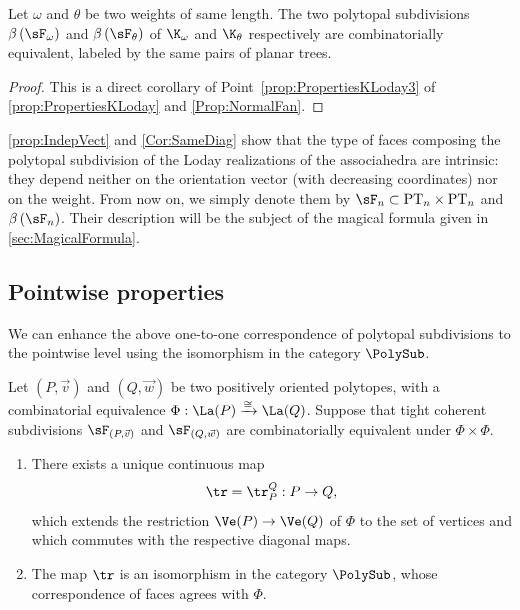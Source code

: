 \begin{corollary}\label{Cor:SameDiag}
Let $\omega$ and $\theta$ be two weights of same length.
The two polytopal subdivisions $\beta\left(\sF_\omega \right)$ and $\beta\left(\sF_\theta \right)$ of $\K_\omega$ and $\K_\theta$ respectively are combinatorially equivalent, \ie labeled by the same pairs of planar trees.
\end{corollary}

\begin{proof}
This is a direct corollary of Point~\eqref{prop:PropertiesKLoday3} of \cref{prop:PropertiesKLoday} and \cref{Prop:NormalFan}.
\end{proof}

\cref{prop:IndepVect} and \cref{Cor:SameDiag} show that the type of faces composing the polytopal subdivision
of the Loday realizations of the associahedra are intrinsic: they depend neither on the orientation vector (with decreasing coordinates) nor on the weight. From now on, we simply denote them by $\sF_n\subset \mathrm{PT}_n\times \mathrm{PT}_n$ and $\beta\left(\sF_n\right)$. Their description will be the subject of the magical formula given in \cref{sec:MagicalFormula}.

\subsection{Pointwise properties}
We can enhance the above one-to-one correspondence of polytopal subdivisions to the pointwise level using the isomorphism in the category $\PolySub$.

\begin{proposition}\label{prop:Transition}
Let $(P, \vec v)$ and $(Q,\vec w)$ be two positively oriented polytopes, with a combinatorial equivalence $\Phi: \La(P)\xrightarrow{\cong} \La(Q)$.
Suppose that
tight coherent subdivisions
$\sF_{(P, \vec v)}$ and $\sF_{(Q, \vec w)}$ are combinatorially equivalent under
$\Phi\times \Phi$.
\begin{enumerate}
\item\label{prop:Transition1}
There exists a unique continuous map
\[\tr=\tr_P^Q : P\to Q,\]
which extends the restriction $\Ve(P)\to \Ve(Q)$ of $\Phi$ to the set of vertices
and which commutes with the respective diagonal maps.
\item\label{prop:Transition2} The map $\tr$ is an isomorphism in the category $\PolySub$, whose correspondence of faces agrees with $\Phi$.
\end{enumerate}
\end{proposition}

